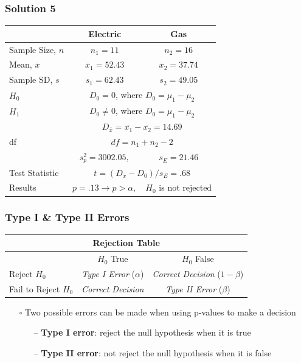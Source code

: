 \documentclass[handout]{beamer}
\begin{document}
\begin{frame}
    \frametitle{Solution 5}
    \centering
    \begin{tabular}{l c c}
    \toprule
         & \textbf{Electric} & \textbf{Gas} \\
    \midrule
        Sample Size, $n$ & $n_1=11$ & $n_2=16$ \\
        Mean, $\overline{x}$ & $\overline{x}_1=52.43$ & $\overline{x}_2=37.74$ \\
        Sample SD, $s$ & $s_1=62.43$ & $s_2=49.05$ \\
    \midrule
        $H_0$ & \multicolumn{2}{c}{$D_0=0$, where $D_0=\mu_1-\mu_2$} \\
        $H_1$ & \multicolumn{2}{c}{$D_0\neq 0$, where $D_0=\mu_1-\mu_2$} \\
         & \multicolumn{2}{c}{$D_{\overline{x}}=\overline{x_1}-\overline{x_2}=14.69$} \\
         df & \multicolumn{2}{c}{$df=n_1+n_2-2$} \\
         & $s_p^2 = 3002.05,$ & $s_E=21.46$ \\
        Test Statistic & \multicolumn{2}{c}{$t=(D_{\overline{x}}-D_0)/s_E=.68$} \\
        Results & $p=.13\rightarrow p>\alpha,$ & $H_0$ is not rejected \\
    \bottomrule
    \end{tabular}
    \vspace*{\fill}
\end{frame}

\begin{frame}
    \frametitle{Type I \& Type II Errors}
    \centering
    \begin{tabular}{l c c}
    \toprule
        \multicolumn{3}{c}{\textbf{Rejection Table}} \\
    \midrule
         & $H_0$ True & $H_0$ False \\
        Reject $H_0$ & \textit{Type I Error} ({\color{red}$\alpha$}) & \textit{Correct Decision} ($1-\beta$) \\
        Fail to Reject $H_0$ & \textit{Correct Decision} & \textit{Type II Error} ({\color{red}$\beta$}) \\
    \bottomrule
    \end{tabular}
    \vspace{8pt}
    \begin{itemize}[wide = 0pt]
        \item[$\square$] Two possible errors can be made when using p-values to make a decision
        \begin{itemize}
            \item[--] \textbf{Type I error}: reject the null hypothesis when it is true
            \item[--] \textbf{Type II error}: not reject the null hypothesis when it is false
        \end{itemize}
    \end{itemize} 
    \vspace*{\fill}
\end{frame}
\end{document}
